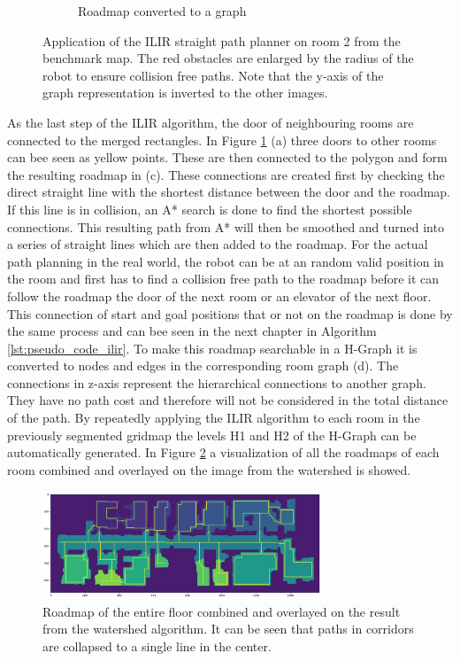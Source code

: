 \begin{figure}[h]
\begin{subfigure}{.25\textwidth}
      \caption{Roadmap converted to a graph}
    \end{subfigure}
    \caption[Application of the ILIR straight path planner on room 2 from the benchmark map]{Application of the ILIR straight path planner on room 2 from the benchmark map. The red obstacles are enlarged by the radius of the robot to ensure collision free paths. Note that the y-axis of the graph representation is inverted to the other images.}
    \label{fig:ilir_room_roadmap}
\end{figure}

As the last step of the ILIR algorithm, the door of neighbouring rooms are connected to the merged rectangles. In Figure \ref{fig:ilir_room_roadmap} (a) three doors to other rooms can bee seen as yellow points. These are then connected to the polygon and form the resulting roadmap in (c). These connections are created first by checking the direct straight line with the shortest distance between the door and the roadmap. If this line is in collision, an A* search is done to find the shortest possible connections. This resulting path from A* will then be smoothed and turned into a series of straight lines which are then added to the roadmap. For the actual path planning in the real world, the robot can be at an random valid position in the room and first has to find a collision free path to the roadmap before it can follow the roadmap the door of the next room or an elevator of the next floor. This connection of start and goal positions that or not on the roadmap is done by the same process and can bee seen in the next chapter in Algorithm \ref{lst:pseudo_code_ilir}. To make this roadmap searchable in a H-Graph it is converted to nodes and edges in the corresponding room graph (d). The connections in z-axis represent the hierarchical connections to another graph. They have no path cost and therefore will not be considered in the total distance of the path. By repeatedly applying the ILIR algorithm to each room in the previously segmented gridmap the levels H1 and H2 of the H-Graph can be automatically generated. In Figure \ref{fig:ryu_roadmap} a visualization of all the roadmaps of each room combined and overlayed on the image from the watershed is showed.

\begin{figure}[h]
    \centering
    \includegraphics[width=0.75\textwidth]{figures/50_implementation/ryu_roadmap.png}
    \caption[Roadmap of the entire floor combined]{Roadmap of the entire floor combined and overlayed on the result from the watershed algorithm. It can be seen that paths in corridors are collapsed to a single line in the center.}
    \label{fig:ryu_roadmap}
\end{figure}

